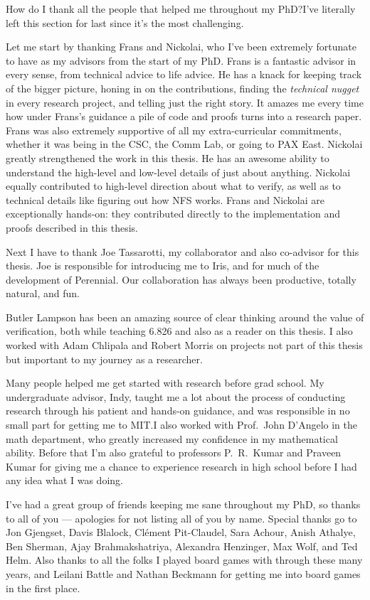 How do I thank all the people that helped me throughout my PhD?\@ I've literally
left this section for last since it's the most challenging.

Let me start by thanking Frans and Nickolai, who I've been extremely fortunate
to have as my advisors from the start of my PhD. Frans is a fantastic advisor in
every sense, from technical advice to life advice. He has a knack for keeping
track of the bigger picture, honing in on the contributions, finding the
\emph{technical nugget} in every research project, and telling just the right
story. It amazes me every time how under Frans's guidance a pile of code and
proofs turns into a research paper. Frans was also extremely supportive of all
my extra-curricular commitments, whether it was being in the CSC, the Comm Lab,
or going to PAX East. Nickolai greatly strengthened the work in this thesis. He
has an awesome ability to understand the high-level and low-level details of
just about anything. Nickolai equally contributed to high-level direction about
what to verify, as well as to technical details like figuring out how NFS works.
Frans and Nickolai are exceptionally hands-on: they contributed directly to the
implementation and proofs described in this thesis.

Next I have to thank Joe Tassarotti, my collaborator and also co-advisor for
this thesis. Joe is
responsible for introducing me to Iris, and for much of the development of
Perennial. Our collaboration has always been productive, totally natural, and fun.

Butler Lampson has been an amazing source of clear thinking around the value of
verification, both while teaching 6.826 and also as a reader on this thesis. I
also worked with Adam Chlipala and Robert Morris on projects not part of this
thesis but important to my journey as a researcher.

Many people helped me get started with research before grad school. My
undergraduate advisor, Indy, taught me a lot about the process of conducting
research through his patient and hands-on guidance, and was responsible in no
small part for getting me to MIT.\@ I also worked with Prof.~John D'Angelo in
the math department, who greatly increased my confidence in my mathematical
ability. Before that I'm also grateful to professors P.~R.~Kumar and Praveen
Kumar for giving me a chance to experience research in high school before I had
any idea what I was doing.

I've had a great group of friends keeping me sane throughout my PhD, so thanks
to all of you --- apologies for not listing all of you by name. Special thanks
go to Jon Gjengset, Davis Blalock, Cl\'ement Pit-Claudel, Sara Achour, Anish Athalye, Ben Sherman,
Ajay Brahmakshatriya, Alexandra Henzinger, Max Wolf, and
Ted Helm. Also thanks to all the folks I played board
games with through these many years, and Leilani Battle and Nathan Beckmann for
getting me into board games in the first place.

